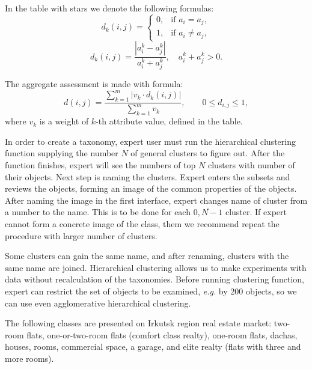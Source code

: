 \documentclass[conference]{IEEEtran}
\begin{document}
In the table with stars we denote the following formulas:
\[
  d_k(i,j) = \left\{
                                                          \begin{array}{ll}
                                                            0, & \mbox{if\ \ } a_i=a_j,\\
                                                            1, & \mbox{if\ \ } a_i\neq a_j,
                                                          \end{array}
                                                          \right.
  \tag{\star}
\]
\[
  d_k(i,j) = \frac{|a_i^k-a_j^k|}{a_i^k+a_j^k},\quad a_i^k+a_j^k>0.
  \tag{\star\star}
\]

The aggregate assessment is made with formula:
\[
  d(i,j)=\frac{\sum\limits_{k=1}^m|v_k\cdot d_k(i,j)|}{\sum\limits_{k=1}^m v_k}, \qquad 0\leqslant d_{i,j}\leqslant 1,
\]
\noindent where $v_k$ is a weight of $k$-th attribute value, defined in the table. %

In order to create a taxonomy, expert user must run the hierarchical clustering function supplying the number $N$ of general clusters to figure out.  After the function finishes, expert will see the numbers of top $N$ clusters with number of their objects.  Next step is naming the clusters.  Expert enters the subsets and reviews the objects, forming an image of the common properties of the objects.  After naming the image in the first interface, expert changes name of cluster from a number to the name.  This is to be done for each $\overline{0,N-1}$ cluster.  If expert cannot form a concrete image of the class, them we recommend repeat the procedure with larger number of clusters.

Some clusters can gain the same name, and after renaming, clusters with the same name are joined.  Hierarchical clustering allows us to make experiments with data without recalculation of the taxonomies.  Before running clustering function, expert can restrict the set of objects to be examined, \emph{e.g.} by 200 objects, so we can use even agglomerative hierarchical clustering.

The following classes are presented on Irkutsk region real estate market: two-room flats, one-or-two-room flats (comfort class realty), one-room flats, dachas, houses, rooms, commercial space, a garage, and elite realty (flats with three and more rooms).
\end{document}
